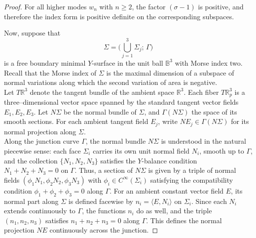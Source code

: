 \documentclass[11pt]{amsart}
\numberwithin{equation}{section}
\theoremstyle{theorem}
\theoremstyle{definition}
\numberwithin{equation}{section}
\begin{document}
\begin{proof}
For all higher modes $w_n$ with $n\ge2$, the factor $(\sigma-1)$
is positive, and therefore the index form is positive definite
on the corresponding subspaces.\\


\medskip

Now, suppose that 
\[
\Sigma = \Big(\bigcup_{j=1}^{3}\Sigma_j;\,\Gamma \Big)
\]
is a free boundary minimal $Y$-surface in the unit ball $\mathbb{B}^3$ with Morse index two. 
Recall that the Morse index of $\Sigma$ is the maximal dimension of a subspace of normal variations along which the second variation of area is negative.\\
Let $T\mathbb{R}^3$ denote the tangent bundle of the ambient space
$\mathbb{R}^3$.
 Each fiber $T\mathbb{R}^3_p$ is a three--dimensional vector space spanned by the standard tangent vector fields $E_1,E_2,E_3$. 
Let $N\Sigma$ be the normal bundle of $\Sigma$, and $\Gamma(N\Sigma)$ the space of its smooth sections. 
For each ambient tangent field $E_j$, write $NE_j\in \Gamma(N\Sigma)$ for its normal projection along $\Sigma$.\\
Along the junction curve $\Gamma$, the normal bundle $N\Sigma$ is understood
in the natural piecewise sense: each face $\Sigma_i$ carries its own unit normal field $N_i$, smooth up to $\Gamma$, and the collection $\{N_1,N_2,N_3\}$ satisfies the $Y$-balance condition
$N_1+N_2+N_3=0$ on $\Gamma$.  Thus, a section of $N\Sigma$ is given by
a triple of normal fields $(\phi_1 N_1,\phi_2 N_2,\phi_3 N_3)$
with $\phi_i\in C^\infty(\Sigma_i)$ satisfying the compatibility condition
$\phi_1+\phi_2+\phi_3=0$ along $\Gamma$.
For an ambient constant vector field $E$, its normal part along $\Sigma$ is defined
facewise by $n_i=\langle E,N_i\rangle$ on $\Sigma_i$.
Since each $N_i$ extends continuously to $\Gamma$, the functions $n_i$ do as well,
and the triple $(n_1,n_2,n_3)$ satisfies $n_1+n_2+n_3=0$ along $\Gamma$.
This defines the normal projection $NE$ continuously across the junction.
\medskip


\end{proof}
\end{document}
